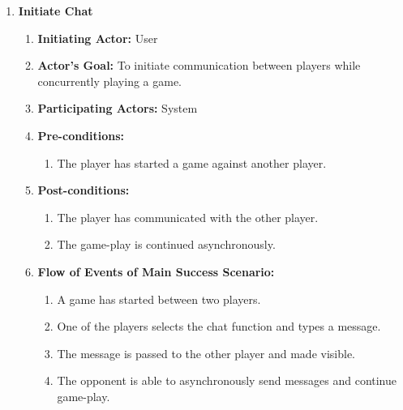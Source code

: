 \documentclass[12pt, titlepage]{article}
\begin{document}
\begin{enumerate}[{UC}1.]
                \item \textbf{Initiate Chat}
                    \begin{enumerate}[{ }]
                        \item \textbf{Initiating Actor:}
                            User
                            
                        \item \textbf{Actor's Goal:}
                            To initiate communication between players while concurrently playing a game.
                            
                        \item \textbf{Participating Actors:}
                            System
                            
                        \item \textbf{Pre-conditions:}
                            \begin{enumerate}
                                \item The player has started a game against another player.
                            \end{enumerate}
                        \item \textbf{Post-conditions:}
                            \begin{enumerate}
                                \item The player has communicated with the other player.
                                \item The game-play is continued asynchronously.
                            \end{enumerate}
                        \item \textbf{Flow of Events of Main Success Scenario:}
                            \begin{enumerate}
                                \item A game has started between two players.
                                \item One of the players selects the chat function and types a message.
                                \item The message is passed to the other player and made visible.
                                \item The opponent is able to asynchronously send messages and continue game-play.
                            \end{enumerate}
                    \end{enumerate}
                    

\end{enumerate}
\end{document}

